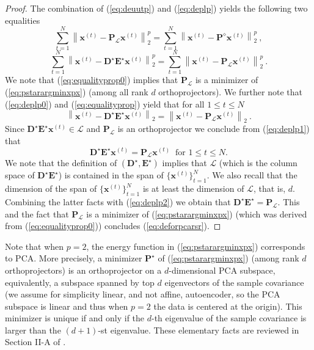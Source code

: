 \documentclass{article} \usepackage{iclr2020_conference,times}
\def\eqref#1{(\ref{#1})}
\def\LL{{\mathscr{L}}}
\def\rvx{{\mathbf{x}}}
\def\rmD{{\mathbf{D}}}
\def\rmE{{\mathbf{E}}}
\def\rmP{{\mathbf{P}}}
\newcommand{\norm}[1]{\left\lVert#1\right\rVert}
\begin{document}
\begin{proof}
The combination of \eqref{eq:deuutp} and \eqref{eq:deplp} yields the following two equalities
\begin{equation}
\label{eq:equalityprop0}
    \sum_{t=1}^N \norm{\rvx^{(t)} - \rmP_{\LL} \rvx^{(t)}}_2^p = \sum_{t=1}^N \norm{\rvx^{(t)} - \rmP^{\diamond} \rvx^{(t)}}_2^p ~,
\end{equation}
\begin{equation}
\label{eq:equalityprop}
    \sum_{t=1}^N \norm{\rvx^{(t)} - \rmD^{\star} \rmE^{\star} \rvx^{(t)}}_2^p = \sum_{t=1}^N \norm{\rvx^{(t)} - \rmP_{\LL} \rvx^{(t)}}_2^p ~.
\end{equation}
We note that \eqref{eq:equalityprop0} implies  that $\rmP_{\LL}$ is a minimizer of \eqref{eq:pstarargminxpx} (among all rank $d$ orthoprojectors).
We further note that \eqref{eq:deplp0} and \eqref{eq:equalityprop} yield that for all 
$1 \leq t \leq N$
\begin{equation}
\label{eq:deplp1}
    \norm{\rvx^{(t)} - \rmD^{\star} \rmE^{\star} \rvx^{(t)}}_2 
    =
    \norm{\rvx^{(t)} - \rmP_{\LL} \rvx^{(t)}}_2 ~. 
\end{equation}
Since $\rmD^{\star} \rmE^{\star} \rvx^{(t)} \in \LL$ and $\rmP_{\LL}$ is an orthoprojector we conclude from \eqref{eq:deplp1} that 
\begin{equation}
\label{eq:deplp2}
\rmD^{\star} \rmE^{\star} \rvx^{(t)} = \rmP_{\LL} \rvx^{(t)} \ \text{ for }1 \leq t \leq N.    
\end{equation}
We note that the definition of $(\rmD^{\star},\rmE^{\star})$ implies that $\LL$ (which is the column space of  
$\rmD^{\star}\rmE^{\star}$) is contained in the span of  $\{\rvx^{(t)}\}_{t=1}^N$. We also recall that the dimension of the span of  $\{\rvx^{(t)}\}_{t=1}^N$ is at least the dimension of $\LL$, that is, $d$. Combining the latter facts with \eqref{eq:deplp2} we obtain that $\rmD^{\star} \rmE^{\star} = \rmP_{\LL}$. 
This and the fact that $\rmP_{\LL}$ is a minimizer of \eqref{eq:pstarargminxpx} (which was derived from \eqref{eq:equalityprop0}) 
concludes \eqref{eq:deforpcarsr}.

\end{proof}

Note that when $p=2$, the energy function in \eqref{eq:pstarargminxpx} corresponds to 
PCA. More precisely, a minimizer $\rmP^{\star}$
of \eqref{eq:pstarargminxpx} (among rank $d$ orthoprojectors) is an orthoprojector on a $d$-dimensional PCA subspace, equivalently, a subspace spanned by top $d$ eigenvectors of the sample covariance (we assume for simplicity linear, and not affine, autoencoder, so the PCA subspace is linear and thus when $p=2$ the data is centered at the origin).  This minimizer is unique if and only if the $d$-th eigenvalue of the sample covariance is larger than the $(d+1)$-st eigenvalue. These elementary facts are reviewed in Section II-A
of \citet{lerman2018overview}.
\end{document}
